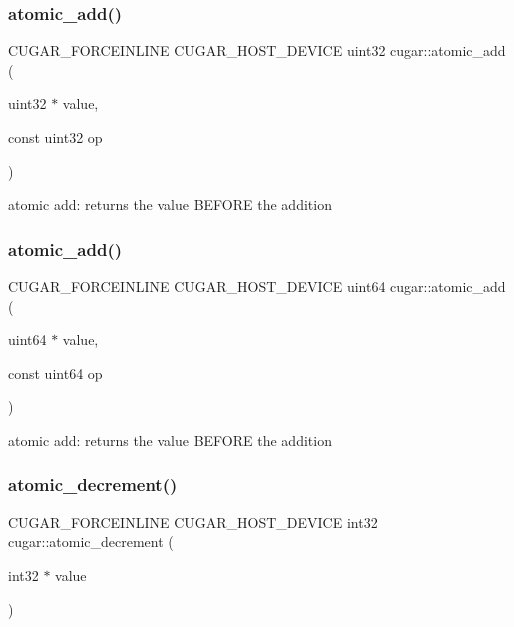 \subsubsection{\texorpdfstring{atomic\+\_\+add()}{atomic\_add()}\hspace{0.1cm}{\footnotesize\ttfamily [3/4]}}
{\footnotesize\ttfamily C\+U\+G\+A\+R\+\_\+\+F\+O\+R\+C\+E\+I\+N\+L\+I\+NE C\+U\+G\+A\+R\+\_\+\+H\+O\+S\+T\+\_\+\+D\+E\+V\+I\+CE uint32 cugar\+::atomic\+\_\+add (\begin{DoxyParamCaption}\item[{uint32 $\ast$}]{value,  }\item[{const uint32}]{op }\end{DoxyParamCaption})}

atomic add\+: returns the value B\+E\+F\+O\+RE the addition \mbox{\label{group___atomics_gaed434d4f310d826a6e39932269de15c4}} 
\subsubsection{\texorpdfstring{atomic\+\_\+add()}{atomic\_add()}\hspace{0.1cm}{\footnotesize\ttfamily [4/4]}}
{\footnotesize\ttfamily C\+U\+G\+A\+R\+\_\+\+F\+O\+R\+C\+E\+I\+N\+L\+I\+NE C\+U\+G\+A\+R\+\_\+\+H\+O\+S\+T\+\_\+\+D\+E\+V\+I\+CE uint64 cugar\+::atomic\+\_\+add (\begin{DoxyParamCaption}\item[{uint64 $\ast$}]{value,  }\item[{const uint64}]{op }\end{DoxyParamCaption})}

atomic add\+: returns the value B\+E\+F\+O\+RE the addition \mbox{\label{group___atomics_ga60cd477d17c1ff78aa673ce06b60b569}} 
\subsubsection{\texorpdfstring{atomic\+\_\+decrement()}{atomic\_decrement()}\hspace{0.1cm}{\footnotesize\ttfamily [1/2]}}
{\footnotesize\ttfamily C\+U\+G\+A\+R\+\_\+\+F\+O\+R\+C\+E\+I\+N\+L\+I\+NE C\+U\+G\+A\+R\+\_\+\+H\+O\+S\+T\+\_\+\+D\+E\+V\+I\+CE int32 cugar\+::atomic\+\_\+decrement (\begin{DoxyParamCaption}\item[{int32 $\ast$}]{value }\end{DoxyParamCaption})}


